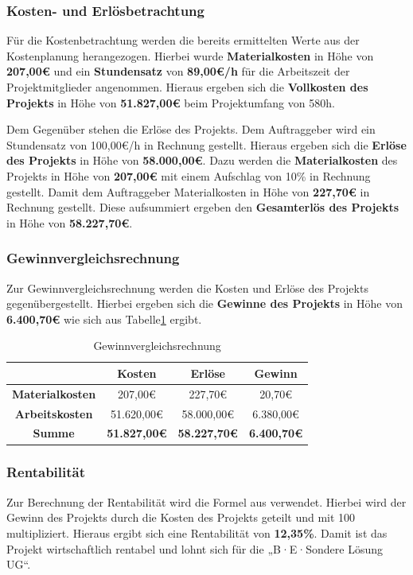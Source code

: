 \documentclass[
  a4paper,
  12pt,
  DIV=12,        %
  parskip=half,  %
  headings=small %
]{scrartcl}
\theoremstyle{definition}
\theoremstyle{definition}
\begin{document}
\subsubsection{Kosten- und Erlösbetrachtung}\label{Kosten-und-Erlösbetrachtung}
Für die Kostenbetrachtung werden die bereits ermittelten Werte aus der Kostenplanung herangezogen. Hierbei wurde \textbf{Materialkosten} in Höhe von \textbf{207,00€} und ein \textbf{Stundensatz} von \textbf{89,00€/h} für die Arbeitszeit der Projektmitglieder angenommen. Hieraus ergeben sich die \textbf{Vollkosten des Projekts} in Höhe von \textbf{51.827,00€} beim Projektumfang von 580h.

Dem Gegenüber stehen die Erlöse des Projekts. Dem Auftraggeber wird ein Stundensatz von 100,00€/h in Rechnung gestellt. Hieraus ergeben sich die \textbf{Erlöse des Projekts} in Höhe von \textbf{58.000,00€}. Dazu werden die \textbf{Materialkosten} des Projekts in Höhe von \textbf{207,00€} mit einem Aufschlag von 10\% in Rechnung gestellt. Damit dem Auftraggeber Materialkosten in Höhe von \textbf{227,70€} in Rechnung gestellt. Diese aufsummiert ergeben den \textbf{Gesamterlös des Projekts} in Höhe von \textbf{58.227,70€}.

\subsubsection{Gewinnvergleichsrechnung}\label{Gewinnvergleichsrechnung}
Zur Gewinnvergleichsrechnung werden die Kosten und Erlöse des Projekts gegenübergestellt. Hierbei ergeben sich die \textbf{Gewinne des Projekts} in Höhe von \textbf{6.400,70€} wie sich aus Tabelle\ref{tab:Gewinnvergleich} ergibt.

\begin{table}[H]
\centering
\begin{tabular}{|c|c|c|c|}
\hline
\textbf{} & \textbf{Kosten} & \textbf{Erlöse} & \textbf{Gewinn} \\
\hline
\textbf{Materialkosten} &  207,00€ & 227,70€ & 20,70€ \\
\hline
\textbf{Arbeitskosten} & 51.620,00€ & 58.000,00€ & 6.380,00€ \\
\hline
\textbf{Summe} & \textbf{51.827,00€} & \textbf{58.227,70€} & \textbf{6.400,70€} \\
\hline
\end{tabular}
\caption{Gewinnvergleichsrechnung}\label{tab:Gewinnvergleich}
\end{table}


\subsubsection{Rentabilität}\label{Rentabilität}
Zur Berechnung der Rentabilität wird die Formel aus \cite{Niemann2019Investitionsrechnung} verwendet. Hierbei wird der Gewinn des Projekts durch die Kosten des Projekts geteilt und mit 100 multipliziert. Hieraus ergibt sich eine Rentabilität von \textbf{12,35\%}. Damit ist das Projekt wirtschaftlich rentabel und lohnt sich für die „B·E·Sondere Lösung UG``.
\end{document}
